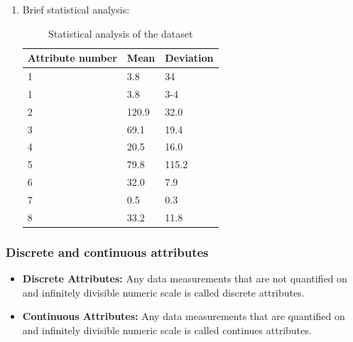 \documentclass[a4paper,14pt,onecolumn]{article}
\begin{document}
\begin{enumerate}
\item Brief statistical analysis:
\begin{table}[h!]
 \begin{center}
    \begin{tabular}{ | l | l | l |}
    \hline
    Attribute number & Mean & Deviation  \\ \hline
    1  &	3.8 & 34\\ \hline
    1	&  3.8  &	3-4\\ \hline
	2	& 120.9	 & 32.0\\ \hline
	3	& 69.1 &	19.4\\ \hline
	4	& 20.5	& 16.0\\ \hline
	5	& 79.8	& 115.2\\ \hline
	6	& 32.0	& 7.9\\ \hline
	7	& 0.5	& 0.3\\ \hline
	8	& 33.2 &	11.8\\
    \hline
    \end{tabular}
   \caption{Statistical analysis of the dataset}
\end{center}
\end{table}    
\end{enumerate}
\newpage
\subsubsection{Discrete and continuous attributes}
\begin{itemize}
\item	 \textbf{Discrete Attributes:} Any data measurements that are not quantified on and infinitely divisible numeric scale is called discrete attributes.

\item \textbf{Continuous Attributes:} Any data measurements that are quantified on and infinitely divisible numeric scale is called continues attributes.

\end{itemize}
\end{document}
